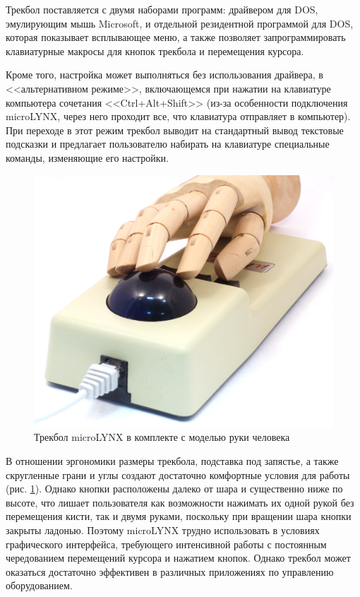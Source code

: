 \documentclass[11pt, a4paper]{article}
\begin{document}
Трекбол поставляется с двумя наборами программ: драйвером для DOS, эмулирующим мышь Microsoft, и отдельной резидентной программой для DOS, которая показывает всплывающее меню, а также позволяет запрограммировать клавиатурные макросы для кнопок трекбола и перемещения курсора.

Кроме того, настройка может выполняться без использования драйвера, в <<альтернативном режиме>>, включающемся при нажатии на клавиатуре компьютера сочетания <<Ctrl+Alt+Shift>> (из-за особенности подключения microLYNX, через него проходит все, что клавиатура отправляет в компьютер). При переходе в этот режим трекбол выводит на стандартный вывод текстовые подсказки и предлагает пользователю набирать на клавиатуре специальные команды, изменяющие его настройки.

\begin{figure}[h]
    \centering
    \includegraphics[scale=0.4]{1986_honeywell_microlynx_trackball/hand_60.jpg}
    \caption{Трекбол microLYNX в комплекте с моделью руки человека}
    \label{fig:microLYNXHand}
\end{figure}

В отношении эргономики размеры трекбола, подставка под запястье, а также скругленные грани и углы создают достаточно комфортные условия для работы (рис. \ref{fig:microLYNXHand}). Однако кнопки расположены далеко от шара и существенно ниже по высоте, что лишает пользователя как возможности нажимать их одной рукой без перемещения кисти, так и двумя руками, поскольку при вращении шара кнопки закрыты ладонью. Поэтому microLYNX трудно использовать в условиях графического интерфейса, требующего интенсивной работы с постоянным чередованием перемещений курсора и нажатием кнопок. Однако трекбол может оказаться достаточно эффективен в различных приложениях по управлению оборудованием.
\end{document}
